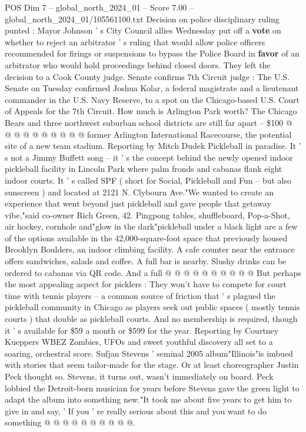 \begin{textsample}{POS Dim 7 – global\_north\_2024\_01 – Score 7.00 – global\_north\_2024\_01/105561100.txt}
Decision on police disciplinary ruling punted : Mayor Johnson ' s City Council allies Wednesday put off a \textbf{vote} on whether to reject an arbitrator ' s ruling that would allow police officers recommended for firings or suspensions to bypass the Police Board in \textbf{favor} of an arbitrator who would hold proceedings behind closed doors.
They left the decision to a Cook County judge.
Senate confirms 7th Circuit judge : The U.S.
Senate on Tuesday confirmed Joshua Kolar, a federal magistrate and a lieutenant commander in the U.S.
Navy Reserve, to a spot on the Chicago-based U.S.
Court of Appeals for the 7th Circuit.
How much is Arlington Park worth?
The Chicago Bears and three northwest suburban school districts are still far apart -- \$100 @ @ @ @ @ @ @ @ @ @ former Arlington International Racecourse, the potential site of a new team stadium.
Reporting by Mitch Dudek Pickleball in paradise.
It ' s not a Jimmy Buffett song -- it ' s the concept behind the newly opened indoor pickleball facility in Lincoln Park where palm fronds and cabanas flank eight indoor courts.
It ' s called SPF ( short for Social, Pickleball and Fun -- but also sunscreen ) and located at 2121 N.
Clybourn Ave."We wanted to create an experience that went beyond just pickleball and gave people that getaway vibe,"said co-owner Rich Green, 42.
Pingpong tables, shuffleboard, Pop-a-Shot, air hockey, cornhole and"glow in the dark"pickleball under a black light are a few of the options available in the 42,000-square-foot space that previously housed Brooklyn Boulders, an indoor climbing facility.
A cafe counter near the entrance offers sandwiches, salads and coffee.
A full bar is nearby.
Slushy drinks can be ordered to cabanas via QR code.
And a full @ @ @ @ @ @ @ @ @ @ But perhaps the most appealing aspect for picklers : They won't have to compete for court time with tennis players -- a common source of friction that ' s plagued the pickleball community in Chicago as players seek out public spaces ( mostly tennis courts ) that double as pickleball courts.
And no membership is required, though it ' s available for \$59 a month or \$599 for the year.
Reporting by Courtney Kueppers WBEZ Zombies, UFOs and sweet youthful discovery all set to a soaring, orchestral score.
Sufjan Stevens ' seminal 2005 album"Illinois"is imbued with stories that seem tailor-made for the stage.
Or at least choreographer Justin Peck thought so.
Stevens, it turns out, wasn't immediately on board.
Peck lobbied the Detroit-born musician for years before Stevens gave the green light to adapt the album into something new."It took me about five years to get him to give in and say, ' If you ' re really serious about this and you want to do something @ @ @ @ @ @ @ @ @ @.

\end{textsample}
